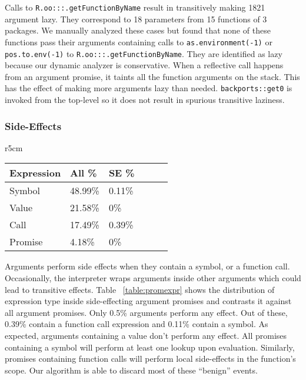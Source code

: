 \documentclass[review,nonacm,screen,acmsmall,anonymous=true]{acmart}
\newcommand{\code}[1]{\lstinline |#1|\xspace}
\begin{document}
%
Calls to \code{R.oo:::.getFunctionByName} result in transitively making 1821
argument lazy. They correspond to 18 parameters from 15 functions of 3 packages.
We manually analyzed these cases but found that none of these functions pass
their arguments containing calls to \code{as.environment(-1)} or
\code{pos.to.env(-1)} to \code{R.oo:::.getFunctionByName}. They are identified
as lazy because our dynamic analyzer is conservative. When a reflective call
happens from an argument promise, it taints all the function arguments on the
stack. This has the effect of making more arguments lazy than needed.
%
\code{backports::get0} is invoked from the top-level so it does not result in
spurious transitive laziness.

\subsubsection{Side-Effects}

\begin{wraptable}{r}{5cm}
  \vspace{-3mm}
  \small
  \caption{Promise Expression} \label{table:promexpr}
  \centering
  \begin{tabular}{llllll}
    \toprule
    \textbf{Expression}&\textbf{All \%}&\textbf{SE \%}\\
    \midrule
    Symbol&48.99\%&0.11\%\\
    Value&21.58\%&0\%\\
    Call&17.49\%&0.39\%\\
    Promise&4.18\%&0\%\\
    \bottomrule
  \end{tabular}
\end{wraptable}

Arguments perform side effects when they contain a symbol, or a function call.
Occasionally, the interpreter wraps arguments inside other arguments which could
lead to transitive effects. Table ~\ref{table:promexpr} shows the distribution
of expression type inside side-effecting argument promises and contrasts it
against all argument promises. Only 0.5\% arguments perform any effect. Out of
these, 0.39\% contain a function call expression and 0.11\% contain a symbol. As
expected, arguments containing a value don't perform any effect. All promises
containing a symbol will perform at least one lookup upon evaluation. Similarly,
promises containing function calls will perform local side-effects in the
function's scope. Our algorithm is able to discard most of these ``benign''
events.
\end{document}
